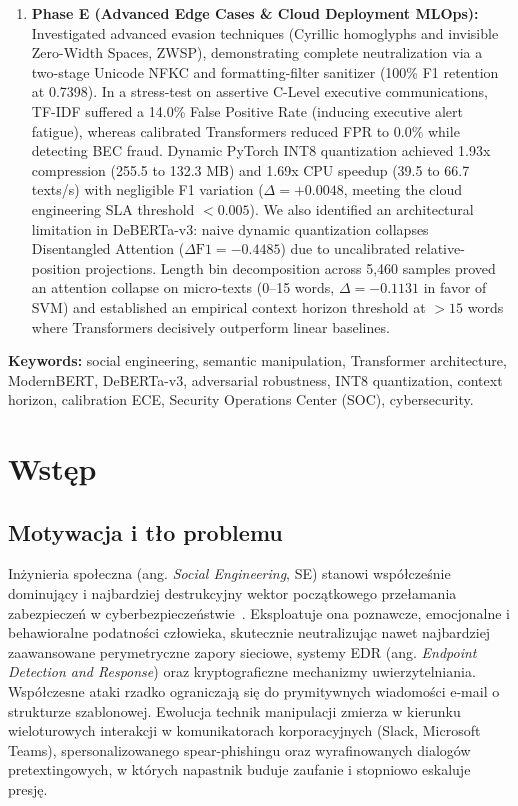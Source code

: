 \documentclass[12pt,a4paper,twoside]{report}
\begin{document}
\begin{enumerate}[leftmargin=*]
  \item \textbf{Phase E (Advanced Edge Cases \& Cloud Deployment MLOps):} Investigated advanced evasion techniques (Cyrillic homoglyphs and invisible Zero-Width Spaces, ZWSP), demonstrating complete neutralization via a two-stage Unicode NFKC and formatting-filter sanitizer (100\% F1 retention at 0.7398). In a stress-test on assertive C-Level executive communications, TF-IDF suffered a 14.0\% False Positive Rate (inducing executive alert fatigue), whereas calibrated Transformers reduced FPR to 0.0\% while detecting BEC fraud. Dynamic PyTorch INT8 quantization achieved 1.93x compression (255.5 to 132.3 MB) and 1.69x CPU speedup (39.5 to 66.7 texts/s) with negligible F1 variation ($\Delta = +0.0048$, meeting the cloud engineering SLA threshold $<0.005$). We also identified an architectural limitation in DeBERTa-v3: naive dynamic quantization collapses Disentangled Attention ($\Delta\text{F1} = -0.4485$) due to uncalibrated relative-position projections. Length bin decomposition across 5,460 samples proved an attention collapse on micro-texts (0--15 words, $\Delta = -0.1131$ in favor of SVM) and established an empirical context horizon threshold at $>15$ words where Transformers decisively outperform linear baselines.
\end{enumerate}

\noindent\textbf{Keywords:}
social engineering, semantic manipulation, Transformer architecture, ModernBERT, DeBERTa-v3, adversarial robustness, INT8 quantization, context horizon, calibration ECE, Security Operations Center (SOC), cybersecurity.

\newpage

\chapter{Wstęp}

\section{Motywacja i tło problemu}
Inżynieria społeczna (ang. \emph{Social Engineering}, SE) stanowi współcześnie dominujący i najbardziej destrukcyjny wektor początkowego przełamania zabezpieczeń w cyberbezpieczeństwie~\cite{mitnick2002}. Eksploatuje ona poznawcze, emocjonalne i behawioralne podatności człowieka, skutecznie neutralizując nawet najbardziej zaawansowane perymetryczne zapory sieciowe, systemy EDR (ang. \emph{Endpoint Detection and Response}) oraz kryptograficzne mechanizmy uwierzytelniania. Współczesne ataki rzadko ograniczają się do prymitywnych wiadomości e-mail o strukturze szablonowej. Ewolucja technik manipulacji zmierza w kierunku wieloturowych interakcji w komunikatorach korporacyjnych (Slack, Microsoft Teams), spersonalizowanego spear-phishingu oraz wyrafinowanych dialogów pretextingowych, w których napastnik buduje zaufanie i stopniowo eskaluje presję.
\end{document}

